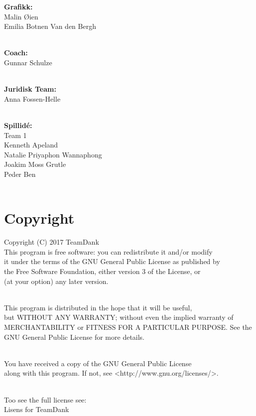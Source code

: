 \documentclass[paper=a4]{article}
\begin{document}
\begin{center}
\textbf{Grafikk:} \\
Malin Øien \\
Emilia Botnen Van den Bergh \\ \

\textbf{Coach:} \\
Gunnar Schulze \\ \ 

\textbf{Juridisk Team:} \\ 
Anna Fossen-Helle \\ \

\textbf{Spillidé:} \\
Team 1 \\
Kenneth Apeland \\
Natalie Priyaphon Wannaphong \\
Joakim Moss Grutle \\
Peder Ben \\ \

\section{Copyright}

 Copyright (C) 2017  TeamDank\\

 This program is free software: you can redistribute it and/or modify \\
 it under the terms of the GNU General Public License as published by \\
 the Free Software Foundation, either version 3 of the License, or \\
 (at your option) any later version.\\ \
 
 This program is distributed in the hope that it will be useful, \\
 but WITHOUT ANY WARRANTY; without even the implied warranty of \\
 MERCHANTABILITY or FITNESS FOR A PARTICULAR PURPOSE.  See the \\
 GNU General Public License for more details.\\ \

You have received a copy of the GNU General Public License \\
along with this program.  If not, see <http://www.gnu.org/licenses/>. \\ \

Too see the full license see: \\
Lisens for TeamDank
\end{center}
\end{document}
